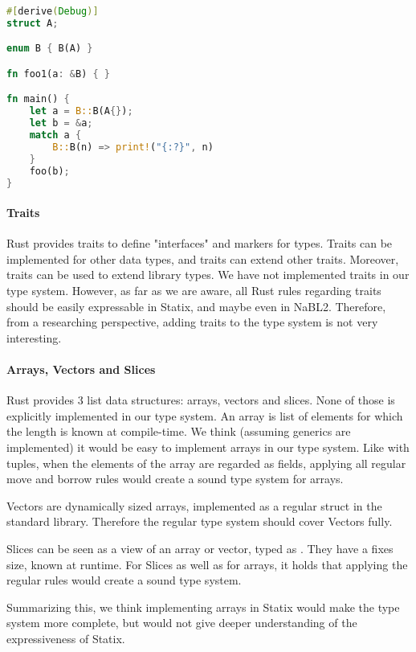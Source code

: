 \begin{lstlisting}[language=rust, showstringspaces=false, escapechar=~, label={lst:match_ref}, caption={Example of complex parametric constraints}]
#[derive(Debug)]
struct A;

enum B { B(A) } 

fn foo1(a: &B) { }

fn main() {
    let a = B::B(A{});
    let b = &a;
    match a {
        B::B(n) => print!("{:?}", n)
    }
    foo(b);
}
\end{lstlisting}

\paragraph{Traits}

Rust provides traits to define "interfaces" and markers for types. Traits can be implemented for other data types, and traits can extend other traits. Moreover, traits can be used to extend library types. We have not implemented traits in our type system. However, as far as we are aware, all Rust rules regarding traits should be easily expressable in Statix, and maybe even in NaBL2. Therefore, from a researching perspective, adding traits to the type system is not very interesting.

\paragraph{Arrays, Vectors and Slices}

Rust provides 3 list data structures: arrays, vectors and slices. None of those is explicitly implemented in our type system. An array is list of elements for which the length is known at compile-time. We think (assuming generics are implemented) it would be easy to implement arrays in our type system. Like with tuples, when the elements of the array are regarded as fields, applying all regular move and borrow rules would create a sound type system for arrays.

Vectors are dynamically sized arrays, implemented as a regular struct in the standard library. Therefore the regular type system should cover Vectors fully.

Slices can be seen as a view of an array or vector, typed as \code{&[T]}. They have a fixes size, known at runtime. For Slices as well as for arrays, it holds that applying the regular rules would create a sound type system. 

Summarizing this, we think implementing arrays in Statix would make the type system more complete, but would not give deeper understanding of the expressiveness of Statix.

